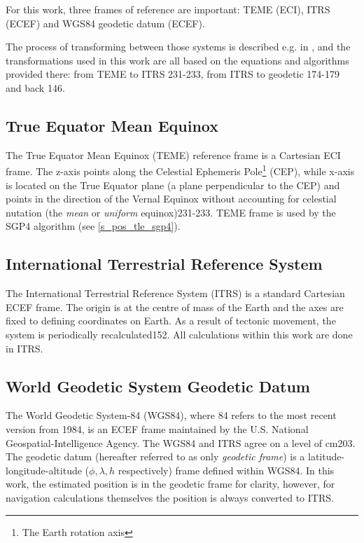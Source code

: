 For this work, three frames of reference are important: TEME (ECI), ITRS (ECEF) and WGS84 geodetic datum (ECEF).

The process of transforming between those systems is described e.g. in \cite{pos01}, and the transformations used in this work are all based on the equations and algorithms provided there: from TEME to ITRS \citep{pos01}{231-233}, from ITRS to geodetic \citep{pos01}{174-179} and back \citep{pos01}{146}.

\subsection{True Equator Mean Equinox}
The True Equator Mean Equinox (TEME) reference frame is a Cartesian ECI frame. The z-axis points along the Celestial Ephemeris Pole\footnote{The Earth rotation axis} (CEP), while x-axis is located on the True Equator plane (a plane perpendicular to the CEP) and points in the direction of the Vernal Equinox without accounting for celestial nutation (the \textit{mean} or \textit{uniform} equinox)\citep{pos01}{231-233}. TEME frame is used by the SGP4 algorithm (see \autoref{s_pos_tle_sgp4}).

\subsection{International Terrestrial Reference System}
The International Terrestrial Reference System (ITRS) is a standard Cartesian ECEF frame. The origin is at the centre of mass of the Earth and the axes are fixed to defining coordinates on Earth. As a result of tectonic movement, the system is periodically recalculated\citep{pos01}{152}. All calculations within this work are done in ITRS.

\subsection{World Geodetic System Geodetic Datum}
The World Geodetic System-84 (WGS84), where 84 refers to the most recent version from 1984, is an ECEF frame maintained by the U.S. National Geospatial-Intelligence Agency. The WGS84 and ITRS agree on a level of \unit{cm}\citep{pos01}{203}. The geodetic datum  (hereafter referred to as only \textit{geodetic frame}) is a latitude-longitude-altitude ($\phi, \lambda, h$ respectively) frame defined within WGS84. In this work, the estimated position is in the geodetic frame for clarity, however, for navigation calculations themselves the position is always converted to ITRS.

